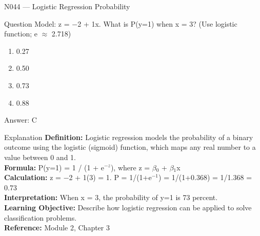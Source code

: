 \documentclass[aspectratio=169,8pt]{beamer}
\begin{document}
	\begin{frame}{N044 --- Logistic Regression Probability}
		\begin{block}{Question}
			Model: z = $-$2 + 1x. What is P(y=1) when x = 3? (Use logistic function; e $\approx$ 2.718)
			\begin{enumerate}
				\item 0.27
				\item 0.50
				\item 0.73
				\item 0.88
			\end{enumerate}
		\end{block}
		\begin{exampleblock}{Answer: C}\end{exampleblock}
		\begin{block}{Explanation}
			\textbf{Definition:} Logistic regression models the probability of a binary outcome using the logistic (sigmoid) function, which maps any real number to a value between 0 and 1.\\
			\textbf{Formula:} P(y=1) = 1 / (1 + e$^{-z}$), where z = $\beta$$_{0}$ + $\beta$$_{1}$x\\
			\textbf{Calculation:} z = $-$2 + 1(3) = 1. P = 1/(1+e$^{-1}$) = 1/(1+0.368) = 1/1.368 = 0.73\\
			\textbf{Interpretation:} When x = 3, the probability of y=1 is 73 percent.\\
			\textbf{Learning Objective:} Describe how logistic regression can be applied to solve classification problems.\\
			\textbf{Reference:} Module 2, Chapter 3
		\end{block}
	\end{frame}
	
\end{document}
